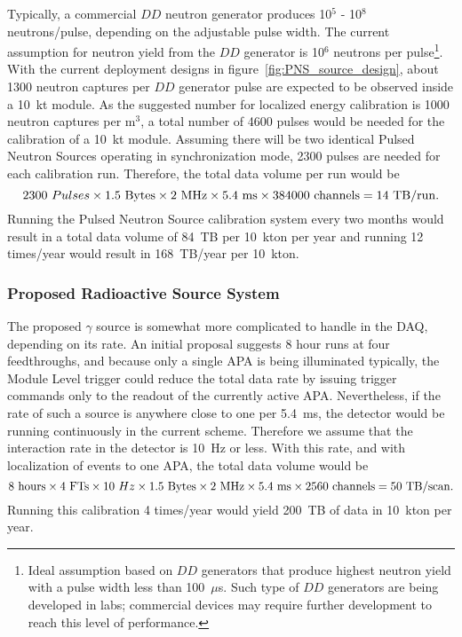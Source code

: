 Typically, a commercial $DD$ neutron generator produces 10$^{5}$ - 10$^{8}$ neutrons/pulse, depending on the adjustable pulse width. The current assumption for neutron yield from the $DD$ generator is 10$^{6}$ neutrons per pulse\footnote{Ideal assumption based on $DD$ generators that produce highest neutron yield with a pulse width less than 100~$\mu$s. Such type of $DD$ generators are being developed in labs; commercial devices may require further development to reach this level of performance.}. With the current deployment designs in figure~\ref{fig:PNS_source_design}, about 1300 neutron captures per $DD$ generator pulse are expected to be observed inside a 10~kt module. As the suggested number for localized energy calibration is 1000 neutron captures per m$^{3}$, a total number of 4600 pulses would be needed for the calibration of a 10~kt module. Assuming there will be two identical Pulsed Neutron Sources operating in synchronization mode, 2300 pulses are needed for each calibration run. Therefore, the total data volume per run would be
\begin{equation}
2300~Pulses \times 1.5~{\rm Bytes}\times
2~{\rm MHz}\times 5.4~{\rm ms}\times384000~{\rm channels} = 14~{\rm TB/run}.
\end{equation}
Running the Pulsed Neutron Source calibration system every two months would result in a total data volume of 84~TB per 10~kton per year and running 12 times/year would result in 168~TB/year per 10~kton. 

\subsubsection{Proposed Radioactive Source System}

The proposed $\gamma$ source is somewhat more complicated to handle in the DAQ, depending on its rate. An initial proposal suggests 8 hour runs at four feedthroughs, and because only a single APA is being illuminated typically, the Module Level trigger could reduce the total data rate by issuing trigger
commands only to the readout of the currently active APA. Nevertheless, if the rate of such a source is anywhere close to one per 5.4~ms, the detector would be running 
continuously 
in the current scheme. Therefore we assume that the
interaction rate in the detector is 10~Hz or less.  With this rate, and with localization of events to one APA, the total data volume would be
\begin{equation}
8~{\rm hours} \times 4~{\rm FTs} \times 10~Hz \times 1.5~{\rm Bytes}\times
2~{\rm MHz}\times 5.4~{\rm ms}\times2560~{\rm channels} = 50~{\rm TB/scan}.
\end{equation}
Running this calibration 4 times/year would yield 200~TB of data in 10~kton per year.





